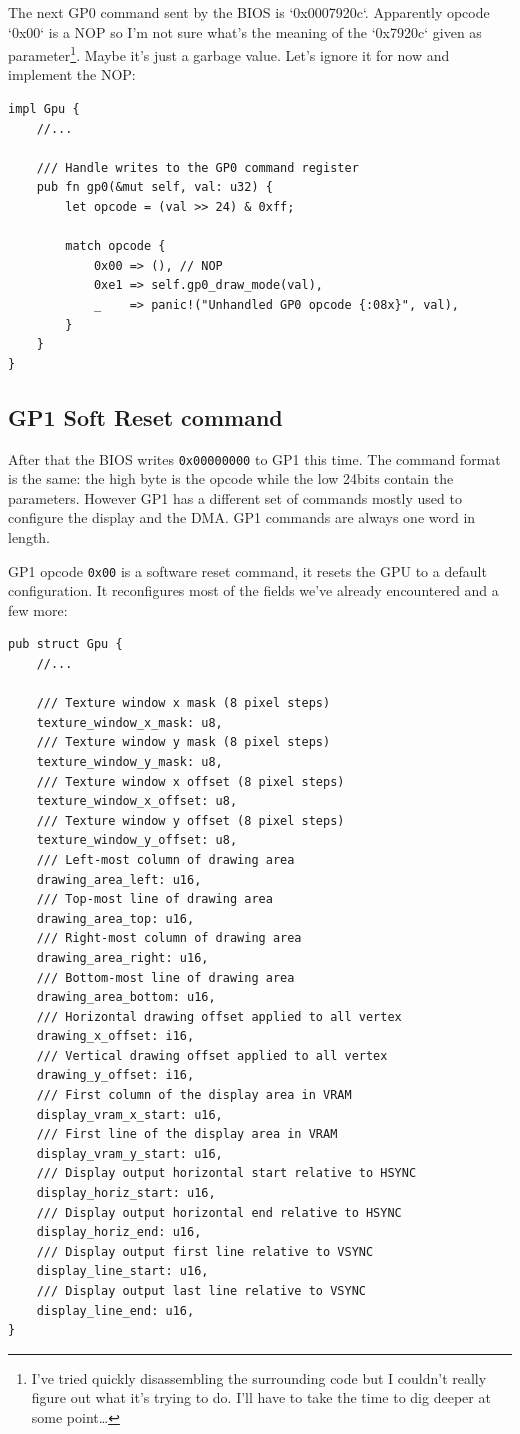 \documentclass[a4paper]{article}
\newcommand{\code}[1] {\texttt{#1}}
\begin{document}
The next GP0 command sent by the BIOS is `0x0007920c`. Apparently
opcode `0x00` is a NOP so I'm not sure what's the meaning of the
`0x7920c` given as parameter\footnote{I've tried quickly disassembling
  the surrounding code but I couldn't really figure out what it's
  trying to do. I'll have to take the time to dig deeper at some
  point\dots{}}. Maybe it's just a garbage value. Let's ignore it for
now and implement the NOP:

\begin{lstlisting}
impl Gpu {
    //...

    /// Handle writes to the GP0 command register
    pub fn gp0(&mut self, val: u32) {
        let opcode = (val >> 24) & 0xff;

        match opcode {
            0x00 => (), // NOP
            0xe1 => self.gp0_draw_mode(val),
            _    => panic!("Unhandled GP0 opcode {:08x}", val),
        }
    }
}
\end{lstlisting}

\subsection{GP1 Soft Reset command}

After that the BIOS writes \code{0x00000000} to GP1 this time. The
command format is the same: the high byte is the opcode while the low
24bits contain the parameters. However GP1 has a different set of
commands mostly used to configure the display and the DMA. GP1
commands are always one word in length.

GP1 opcode \code{0x00} is a software reset command, it resets the GPU
to a default configuration. It reconfigures most of the fields we've
already encountered and a few more:

\begin{lstlisting}
pub struct Gpu {
    //...

    /// Texture window x mask (8 pixel steps)
    texture_window_x_mask: u8,
    /// Texture window y mask (8 pixel steps)
    texture_window_y_mask: u8,
    /// Texture window x offset (8 pixel steps)
    texture_window_x_offset: u8,
    /// Texture window y offset (8 pixel steps)
    texture_window_y_offset: u8,
    /// Left-most column of drawing area
    drawing_area_left: u16,
    /// Top-most line of drawing area
    drawing_area_top: u16,
    /// Right-most column of drawing area
    drawing_area_right: u16,
    /// Bottom-most line of drawing area
    drawing_area_bottom: u16,
    /// Horizontal drawing offset applied to all vertex
    drawing_x_offset: i16,
    /// Vertical drawing offset applied to all vertex
    drawing_y_offset: i16,
    /// First column of the display area in VRAM
    display_vram_x_start: u16,
    /// First line of the display area in VRAM
    display_vram_y_start: u16,
    /// Display output horizontal start relative to HSYNC
    display_horiz_start: u16,
    /// Display output horizontal end relative to HSYNC
    display_horiz_end: u16,
    /// Display output first line relative to VSYNC
    display_line_start: u16,
    /// Display output last line relative to VSYNC
    display_line_end: u16,
}
\end{lstlisting}
\end{document}
